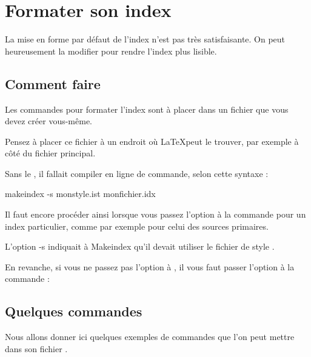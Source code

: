 \chapter{Formater son index}\label{styleindex}

\begin{intro}
La mise en forme par défaut de l'index n'est pas très satisfaisante. On peut heureusement la modifier pour rendre l'index plus lisible.
\end{intro}

\section{Comment faire}
Les commandes pour formater l'index sont à placer dans un fichier  que vous devez créer vous-même.

\begin{attention}
Pensez à placer ce fichier à un endroit où \LaTeX peut le trouver, par exemple à côté du fichier principal.
\end{attention}

Sans le , il fallait compiler en ligne de commande, selon cette syntaxe :

\begin{bashcode}
makeindex -s monstyle.ist monfichier.idx
\end{bashcode}

Il faut encore procéder ainsi lorsque vous passez l'option  à la commande  pour un index particulier, comme par exemple pour celui des sources primaires.

L'option -s indiquait  à Makeindex  qu'il devait utiliser le fichier de style .

En revanche, si vous ne passez pas l'option  à  , il vous faut passer  l'option   à la commande  :

\begin{latexcode}
\makeindex[options=-s  monstyle.ist]
\end{latexcode}




\section{Quelques commandes}

Nous allons donner ici quelques exemples de commandes que l'on peut mettre dans son fichier . 

